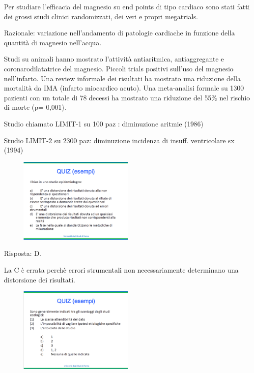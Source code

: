 Per studiare l'efficacia del magnesio su end points di tipo cardiaco
sono stati fatti dei grossi studi clinici randomizzati, dei veri e
propri megatrials.

Razionale: variazione nell'andamento di patologie cardiache in funzione
della quantità di magnesio nell'acqua.

Studi su animali hanno mostrato l'attività antiaritmica, antiaggregante
e coronarodilatatrice del magnesio. Piccoli trials positivi sull'uso del
magnesio nell'infarto. Una review informale dei risultati ha mostrato
una riduzione della mortalità da IMA (infarto miocardico acuto). Una
meta-analisi formale su 1300 pazienti con un totale di 78 decessi ha
mostrato una riduzione del 55\% nel rischio di morte (p= 0,001).

Studio chiamato LIMIT-1 su 100 paz : diminuzione aritmie (1986)

Studio LIMIT-2 su 2300 paz: diminuzione incidenza di insuff.
ventricolare sx (1994)

\begin{figure}[!ht]
\centering
\includegraphics[width=0.5\textwidth]{05/image16.png}
\end{figure}

Risposta: D.

La C è errata perchè errori strumentali non necessariamente determinano
una distorsione dei risultati.

\begin{figure}[!ht]
\centering
\includegraphics[width=0.5\textwidth]{05/image17.png}
\end{figure}

